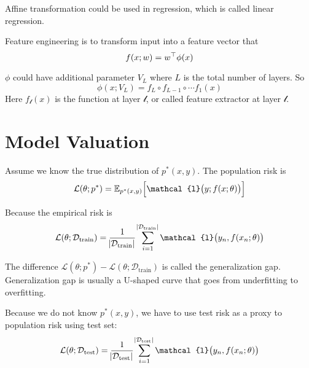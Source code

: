 Affine transformation could be used in regression, which is called linear regression.

\begin{definition}
    Feature engineering is to transform input into a feature vector that 
    \begin{equation}
        f(x;w) = {w}^\top \phi(x)
    \end{equation}
\end{definition}

\begin{definition}\label{multi_layer_percepton}
    $\phi$ could have additional parameter $V_L$ where $L$ is the total number of layers. So
    \begin{equation}
        \phi(x;V_L) = f_L \circ f_{L-1} \circ \cdots f_1 (x)
    \end{equation}
    Here $f_{\mathcal{l}}(x)$ is the function at layer $\mathcal{l}$, or called feature extractor at layer $\mathcal{l}$.
\end{definition}


\section{Model Valuation}

\begin{definition}
    Assume we know the true distribution of $p^*(x,y)$. The population risk is
    \begin{equation}
        \mathcal{L}(\theta;p^*) = \mathbb{E}_{p^*(x,y)}\mleft[\mathcal{l}\mleft(y; f(x;\theta) \mright)\mright]
    \end{equation}
\end{definition}

\begin{definition}
    Because the empirical risk is 
    \begin{equation}
        \mathcal{L}(\theta;\mathcal{D}_{\text{train}}) = \frac{1}{\absolutevalue{\mathcal{D}_{\text{train}}}} \sum_{i=1}^{\absolutevalue{\mathcal{D}_{\text{train}}}} \mathcal{l}\mleft( y_n, f(x_n; \theta) \mright)
    \end{equation}
    
    The difference $\mathcal{L}(\theta;p^*) - \mathcal{L}(\theta;\mathcal{D}_{\text{train}})$ is called the generalization gap. Generalization gap is usually a U-shaped curve that goes from underfitting to overfitting.
    
    Because we do not know $p^*(x,y)$, we have to use test risk as a proxy to population risk using test set:
    \begin{equation}
        \mathcal{L}(\theta;\mathcal{D}_{\text{test}}) = \frac{1}{\absolutevalue{\mathcal{D}_{\text{test}}}} \sum_{i=1}^{\absolutevalue{\mathcal{D}_{\text{test}}}} \mathcal{l}\mleft( y_n, f(x_n; \theta) \mright)
    \end{equation}
\end{definition}

